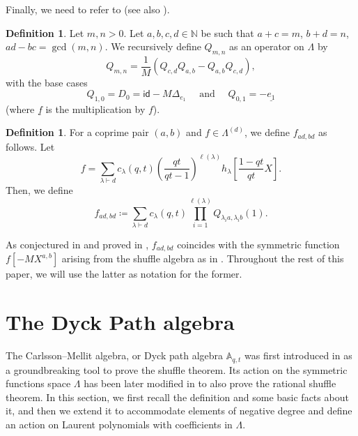 \documentclass[reqno]{amsart}
\theoremstyle{plain}
\theoremstyle{definition}
\newtheorem{definition}[theorem]{Definition}
\theoremstyle{remark}
\newcommand{\A}{\mathbb{A}}%
\newcommand{\<}{\langle}
\renewcommand{\>}{\rangle}
\begin{document}
Finally, we need to refer to \cite[Algorithm~4.1]{BergeronGarsiaSergelXin2015CompositionalShuffleConjectures} (see also \cite[Definition~1.1, Theorem~2.5]{BergeronGarsiaSergelXin2016PlethysticOperators}).

\begin{definition}
    Let $m, n > 0$. Let $a,b,c,d \in \mathbb{N}$ be such that $a+c=m$, $b+d=n$, $ad-bc = \gcd(m,n)$. We recursively define $Q_{m,n}$ as an operator on $\Lambda$ by \[ Q_{m,n} = \frac{1}{M} \left( Q_{c,d} Q_{a,b} - Q_{a,b} Q_{c,d} \right), \] with the base cases \[ Q_{1,0} = D_0 = \mathsf{id} - M \Delta_{e_1} \quad \text{ and } \quad Q_{0,1} = - \underline{e_1} \] (where $\underline{f}$ is the multiplication by $f$).
\end{definition}

\begin{definition}
    \label{def:hall-algebra-op}
    For a coprime pair $(a,b)$ and $f \in \Lambda^{(d)}$, we define $f_{ad,bd}$ as follows. Let \[ f = \sum_{\lambda \vdash d} c_\lambda(q,t) \left( \frac{qt}{qt-1} \right)^{\ell(\lambda)} h_\lambda \left[ \frac{1-qt}{qt} X \right]. \] Then, we define \[ f_{ad,bd} \coloneqq \sum_{\lambda \vdash d} c_\lambda(q,t) \prod_{i=1}^{\ell(\lambda)} Q_{\lambda_i a, \lambda_i b}(1). \]
\end{definition}

As conjectured in \cite{BergeronGarsiaSergelXin2016PlethysticOperators} and proved in \cite{Mellit2021Rational}, $f_{ad,bd}$ coincides with the symmetric function $f[-MX^{a,b}]$ arising from the shuffle algebra as in \cite{Negut2014ShuffleAlgebra}. Throughout the rest of this paper, we will use the latter as notation for the former.


\section{The Dyck Path algebra}
\label{sec:Aqt}

The Carlsson--Mellit algebra, or Dyck path algebra $\A_{q,t}$ was first introduced in \cite{CarlssonMellit2018ShuffleConjecture} as a groundbreaking tool to prove the shuffle theorem. Its action on the symmetric functions space $\Lambda$ has been later modified in \cite{Mellit2021Rational} to also prove the rational shuffle theorem. In this section, we first recall the definition and some basic facts about it, and then we extend it to accommodate elements of negative degree and define an action on Laurent polynomials with coefficients in $\Lambda$.
\end{document}
